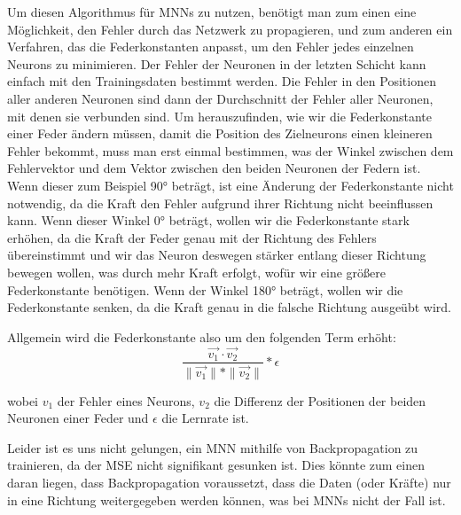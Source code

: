 Um diesen Algorithmus für MNNs zu nutzen, benötigt man zum einen eine Möglichkeit, den Fehler durch das Netzwerk zu propagieren, und zum anderen ein Verfahren, das die Federkonstanten anpasst, um den Fehler jedes einzelnen Neurons zu minimieren.
Der Fehler der Neuronen in der letzten Schicht kann einfach mit den Trainingsdaten bestimmt werden. Die Fehler in den Positionen aller anderen Neuronen sind dann der Durchschnitt der Fehler aller Neuronen, mit denen sie verbunden sind. Um herauszufinden, wie wir die Federkonstante einer Feder ändern müssen, damit die Position des Zielneurons einen kleineren Fehler bekommt, muss man erst einmal bestimmen, was der Winkel zwischen dem Fehlervektor und dem Vektor zwischen den beiden Neuronen der Federn ist. Wenn dieser zum Beispiel 90° beträgt, ist eine Änderung der Federkonstante nicht notwendig, da die Kraft den Fehler aufgrund ihrer Richtung nicht beeinflussen kann. Wenn dieser Winkel 0° beträgt, wollen wir die Federkonstante stark erhöhen, da die Kraft der Feder genau mit der Richtung des Fehlers übereinstimmt und wir das Neuron deswegen stärker entlang dieser Richtung bewegen wollen, was durch mehr Kraft erfolgt, wofür wir eine größere Federkonstante benötigen. Wenn der Winkel 180° beträgt, wollen wir die Federkonstante senken, da die Kraft genau in die falsche Richtung ausgeübt wird.

Allgemein wird die Federkonstante also um den folgenden Term erhöht:
{\[
    \frac{\vec{v_1} \cdot \vec{v_2}}{\| \vec{v_1} \| * \| \vec{v_2} \|} * \epsilon
\]}

wobei $v_1$ der Fehler eines Neurons, $v_2$ die Differenz der Positionen der beiden Neuronen einer Feder und $\epsilon$ die Lernrate ist.

Leider ist es uns nicht gelungen, ein MNN mithilfe von Backpropagation zu trainieren, da der MSE nicht signifikant gesunken ist.
Dies könnte zum einen daran liegen, dass Backpropagation voraussetzt, dass die Daten (oder Kräfte) nur in eine Richtung weitergegeben werden können, was bei MNNs nicht der Fall ist.